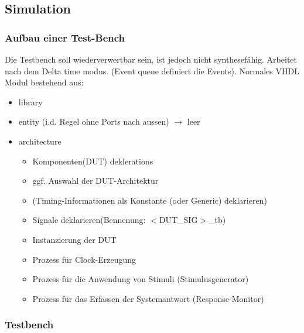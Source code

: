 			\begin{multicols}{2}
				\subsection{Simulation}
		\subsubsection{Aufbau einer Test-Bench}
		Die Testbench soll wiederverwertbar sein, ist jedoch nicht synthesefähig. Arbeitet nach dem Delta time modus. (Event queue definiert die Events).
				Normales VHDL Modul bestehend aus:
				\begin{itemize}
				\itemsep0em
					\item library
					\item entity (i.d. Regel ohne Ports nach aussen) $\rightarrow$ leer
					\item architecture
						\begin{itemize}
						\itemsep0em
							\item Komponenten(DUT) deklerations
							\item ggf. Auswahl der DUT-Architektur
							\item (Timing-Informationen als Konstante (oder 
								Generic) deklarieren)
							\item Signale deklarieren(Bennenung: $<$DUT\_SIG$>$\_tb)
							\item Instanzierung der DUT
							\item Prozess für Clock-Erzeugung
							\item Prozess für die Anwendung von Stimuli 
								(Stimulusgenerator)
							\item Prozess für das Erfassen der Systemantwort 
								(Response-Monitor)
						\end{itemize}
				\end{itemize}
			\end{multicols}
			\begin{multicols}{2}
		\subsubsection{Testbench}
		
		\end{multicols}

